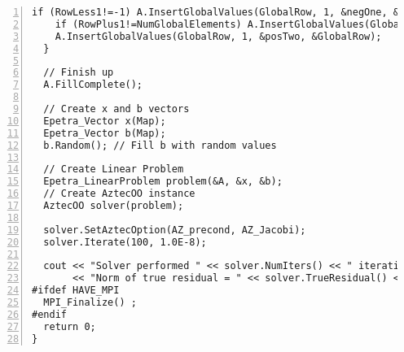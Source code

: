 \begin{Verbatim}[frame=single,numbers=left,fontfamily=courier,fontsize=\tiny]
    if (RowLess1!=-1) A.InsertGlobalValues(GlobalRow, 1, &negOne, &RowLess1);
    if (RowPlus1!=NumGlobalElements) A.InsertGlobalValues(GlobalRow, 1, &negOne, &RowPlus1);
    A.InsertGlobalValues(GlobalRow, 1, &posTwo, &GlobalRow);
  }
  
  // Finish up
  A.FillComplete();

  // Create x and b vectors
  Epetra_Vector x(Map);
  Epetra_Vector b(Map);
  b.Random(); // Fill b with random values

  // Create Linear Problem
  Epetra_LinearProblem problem(&A, &x, &b);
  // Create AztecOO instance
  AztecOO solver(problem);

  solver.SetAztecOption(AZ_precond, AZ_Jacobi);
  solver.Iterate(100, 1.0E-8);

  cout << "Solver performed " << solver.NumIters() << " iterations." << endl
       << "Norm of true residual = " << solver.TrueResidual() << endl;
#ifdef HAVE_MPI
  MPI_Finalize() ;
#endif
  return 0;
}

\end{Verbatim}
